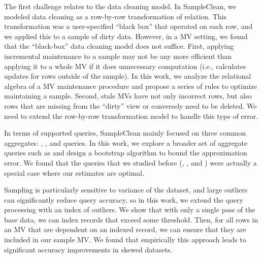 The first challenge relates to the data cleaning model. 
In SampleClean, we modeled data cleaning as a row-by-row transformation of relation. 
This transformation was a user-specified  ``black box'' that operated on each row, and we applied this to a sample of dirty data.
However, in a MV setting, we found that the ``black-box'' data cleaning model does not suffice.
First, applying incremental maintenance to a sample may not be any more efficient than applying it to a whole MV if it does unnecessary computation (i.e., calculates updates for rows outside of the sample).
In this work, we analyze the relational algebra of a MV maintenance procedure and propose a series of rules to optimize maintaining a sample.
Second, stale MVs have not only incorrect rows, but also rows that are missing from the ``dirty'' view or conversely need to be deleted. 
We need to extend the row-by-row transformation model to handle this type of error. 

In terms of supported queries, SampleClean mainly focused on three common aggregates: \sumfunc, \avgfunc, and \countfunc queries.
In this work, we explore a broader set of aggregate queries such as \medfunc and design a bootstrap algorithm to bound the approximation error.
We found that the queries that we studied before (\sumfunc, \avgfunc, and \countfunc) were actually a special case where our estimates are optimal.

Sampling is particularly sensitive to variance of the dataset, and large outliers can significantly reduce query accuracy, so in this work, we extend the query processing with an index of outliers.
We show that with only a single pass of the base data, we can index records that exceed some threshold.
Then, for all rows in an MV that are dependent on an indexed record, we can ensure that they are included in our sample MV.
We found that empirically this approach leads to significant accuracy improvements in skewed datasets.

